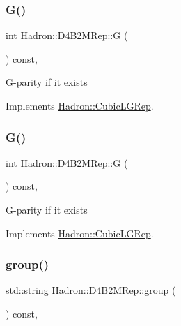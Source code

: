 \subsubsection{\texorpdfstring{G()}{G()}\hspace{0.1cm}{\footnotesize\ttfamily [2/3]}}
{\footnotesize\ttfamily int Hadron\+::\+D4\+B2\+M\+Rep\+::G (\begin{DoxyParamCaption}{ }\end{DoxyParamCaption}) const\hspace{0.3cm}{\ttfamily [inline]}, {\ttfamily [virtual]}}

G-\/parity if it exists 

Implements \mbox{\hyperlink{structHadron_1_1CubicLGRep_ace26f7b2d55e3a668a14cb9026da5231}{Hadron\+::\+Cubic\+L\+G\+Rep}}.

\mbox{\label{structHadron_1_1D4B2MRep_a144db6312f6d067b35490405af2f5873}} 
\subsubsection{\texorpdfstring{G()}{G()}\hspace{0.1cm}{\footnotesize\ttfamily [3/3]}}
{\footnotesize\ttfamily int Hadron\+::\+D4\+B2\+M\+Rep\+::G (\begin{DoxyParamCaption}{ }\end{DoxyParamCaption}) const\hspace{0.3cm}{\ttfamily [inline]}, {\ttfamily [virtual]}}

G-\/parity if it exists 

Implements \mbox{\hyperlink{structHadron_1_1CubicLGRep_ace26f7b2d55e3a668a14cb9026da5231}{Hadron\+::\+Cubic\+L\+G\+Rep}}.

\mbox{\label{structHadron_1_1D4B2MRep_a46c379ad06e057f5ca60549e8a373d01}} 
\subsubsection{\texorpdfstring{group()}{group()}\hspace{0.1cm}{\footnotesize\ttfamily [1/3]}}
{\footnotesize\ttfamily std\+::string Hadron\+::\+D4\+B2\+M\+Rep\+::group (\begin{DoxyParamCaption}{ }\end{DoxyParamCaption}) const\hspace{0.3cm}{\ttfamily [inline]}, {\ttfamily [virtual]}}

